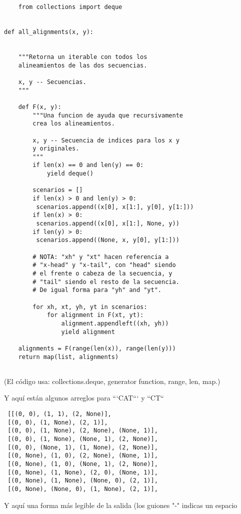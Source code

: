 \documentclass[usenatbib]{tjaa}
\begin{document}
\begin{verbatim}
    from collections import deque


def all_alignments(x, y):

    
    """Retorna un iterable con todos los 
    alineamientos de las dos secuencias.

    x, y -- Secuencias.
    """

    def F(x, y):
        """Una funcion de ayuda que recursivamente
        crea los alineamientos.

        x, y -- Secuencia de indices para los x y
        y originales.
        """
        if len(x) == 0 and len(y) == 0:
            yield deque()

        scenarios = []
        if len(x) > 0 and len(y) > 0:
         scenarios.append((x[0], x[1:], y[0], y[1:]))
        if len(x) > 0:
         scenarios.append((x[0], x[1:], None, y))
        if len(y) > 0:
         scenarios.append((None, x, y[0], y[1:]))

        # NOTA: "xh" y "xt" hacen referencia a 
        # "x-head" y "x-tail", con "head" siendo
        # el frente o cabeza de la secuencia, y
        # "tail" siendo el resto de la secuencia.
        # De igual forma para "yh" and "yt".
        
        for xh, xt, yh, yt in scenarios:
            for alignment in F(xt, yt):
                alignment.appendleft((xh, yh))
                yield alignment

    alignments = F(range(len(x)), range(len(y)))
    return map(list, alignments)
    
\end{verbatim}

(El código usa: collections.deque, generator function, range, len, map.)

Y aquí están algunos arreglos para ```CAT``` y ``CT``

\begin{verbatim}
 [[(0, 0), (1, 1), (2, None)],
 [(0, 0), (1, None), (2, 1)],
 [(0, 0), (1, None), (2, None), (None, 1)],
 [(0, 0), (1, None), (None, 1), (2, None)],
 [(0, 0), (None, 1), (1, None), (2, None)],
 [(0, None), (1, 0), (2, None), (None, 1)],
 [(0, None), (1, 0), (None, 1), (2, None)],
 [(0, None), (1, None), (2, 0), (None, 1)],
 [(0, None), (1, None), (None, 0), (2, 1)],
 [(0, None), (None, 0), (1, None), (2, 1)],
\end{verbatim}

Y aquí una forma más legible de la salida (los guiones "-" indicas un espacio
\end{document}

